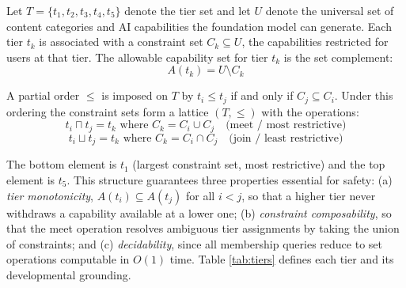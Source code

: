 \documentclass[fleqn,10pt]{wlscirep}
\begin{document}
Let $T = \{t_1, t_2, t_3, t_4, t_5\}$ denote the tier set and let $U$ denote the universal set of content categories and AI capabilities the foundation model can generate. Each tier $t_k$ is associated with a constraint set $C_k \subseteq U$, the capabilities restricted for users at that tier. The allowable capability set for tier $t_k$ is the set complement:
\begin{equation}
A(t_k) = U \setminus C_k
\end{equation}

A partial order $\leq$ is imposed on $T$ by $t_i \leq t_j$ if and only if $C_j \subseteq C_i$. Under this ordering the constraint sets form a lattice $(T, \leq)$ with the operations:
\begin{equation}
t_i \sqcap t_j = t_k \text{ where } C_k = C_i \cup C_j \quad \text{(meet / most restrictive)}
\end{equation}
\begin{equation}
t_i \sqcup t_j = t_k \text{ where } C_k = C_i \cap C_j \quad \text{(join / least restrictive)}
\end{equation}

The bottom element is $t_1$ (largest constraint set, most restrictive) and the top element is $t_5$. This structure guarantees three properties essential for safety: (a) \emph{tier monotonicity}, $A(t_i) \subseteq A(t_j)$ for all $i < j$, so that a higher tier never withdraws a capability available at a lower one; (b) \emph{constraint composability}, so that the meet operation resolves ambiguous tier assignments by taking the union of constraints; and (c) \emph{decidability}, since all membership queries reduce to set operations computable in $O(1)$ time. Table \ref{tab:tiers} defines each tier and its developmental grounding.
\end{document}
